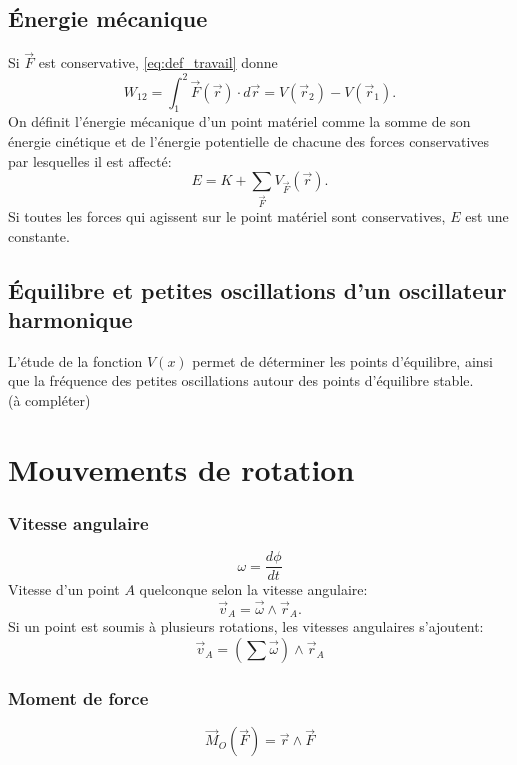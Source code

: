\documentclass{article}
\begin{document}
\subsection{Énergie mécanique}
Si $\vec F$ est conservative, \eqref{eq:def_travail} donne
\begin{equation}
	W_{12} = \int_1^2 \vec F(\vec r) \cdot d \vec r = V(\vec r_2) - V(\vec r_1).
\end{equation}
On définit l'{énergie mécanique} d'un point matériel comme la somme de son énergie cinétique et de l'énergie potentielle de chacune des forces conservatives par lesquelles il est affecté:
\begin{equation}
	\boxed{E = K + \sum_{\vec F} V_{\vec F}(\vec r).}
\end{equation}
Si toutes les forces qui agissent sur le point matériel sont conservatives, $E$ est une constante.


\subsection{Équilibre et petites oscillations d'un oscillateur harmonique}
L'étude de la fonction $V(x)$ permet de déterminer les points d'équilibre, ainsi que la fréquence des petites oscillations autour des points d'équilibre stable.\\
(à compléter)

\section{Mouvements de rotation}
\subsubsection{Vitesse angulaire}
\begin{equation}
	\omega = \frac{d\phi}{dt}
\end{equation}
Vitesse d'un point $A$ quelconque selon la vitesse angulaire:
\begin{equation}
	\vec v_A = \vec \omega \wedge \vec r_A.
\end{equation}
Si un point est soumis à plusieurs rotations, les vitesses angulaires s'ajoutent:
\begin{equation}
	\vec v_A = \left(\sum \vec \omega \right) \wedge \vec r_A
\end{equation}

\subsubsection{Moment de force}
\begin{equation}
	\boxed{\vec M_O(\vec F) = \vec r \wedge \vec F}
\end{equation}
\end{document}
